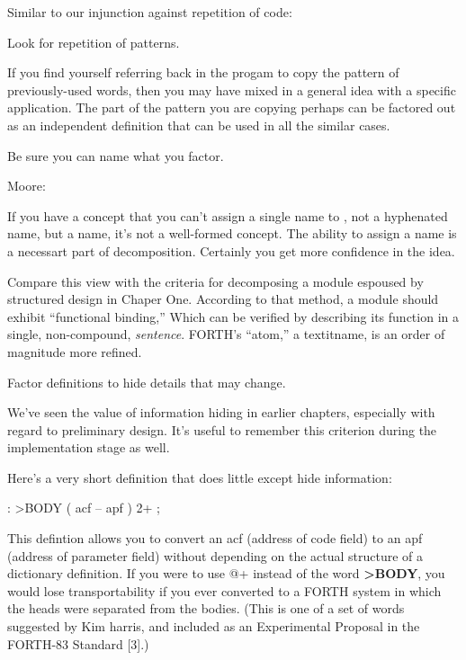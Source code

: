 Similar to our injunction against repetition of code:

\begin{tip}
Look for repetition of patterns.
\end{tip}
If you find yourself referring back in the progam to copy the pattern of previously-used words, then you may have mixed in a general idea with a specific application. The part of the pattern you are copying perhaps can be factored out as an independent definition that can be used in all the similar cases.

\begin{tip}
Be sure you can name what you factor.
\end{tip}

\bigskip
\blackline{2ex}
\noindent Moore:

\begin{tfquot}
If you have a concept that you can't assign a single name to , not a hyphenated name, but a name, it's not a well-formed concept. The ability to assign a name is a necessart part of decomposition. Certainly you get more confidence in the idea.
\end{tfquot}
\blackline{1ex}
Compare this view with the criteria for decomposing a module espoused by structured design in Chaper One. According to that method, a module should exhibit ``functional binding,'' Which can be verified by describing its function in a single, non-compound, \emph{sentence}. FORTH's ``atom,'' a textit{name}, is an order of magnitude more refined.

\begin{tip}
Factor definitions to hide details that may change.
\end{tip}
We've seen the value of information hiding in earlier chapters, especially with regard to preliminary design. It's useful to remember this criterion during the implementation stage as well.

Here's a very short definition that does little except hide information:

\begin{Code}
: >BODY  ( acf -- apf )  2+ ;
\end{Code}


\noindent
This defintion allows you to convert an acf (address of code field) to an apf (address of parameter field) without depending on the actual structure of a dictionary definition. If you were to use @+ instead of the word \textbf{>BODY}, you would lose transportability if you ever converted to a FORTH system in which the heads were separated from the bodies. (This is one of a set of words suggested by Kim harris, and included as an Experimental Proposal in the FORTH-83 Standard [3].)

